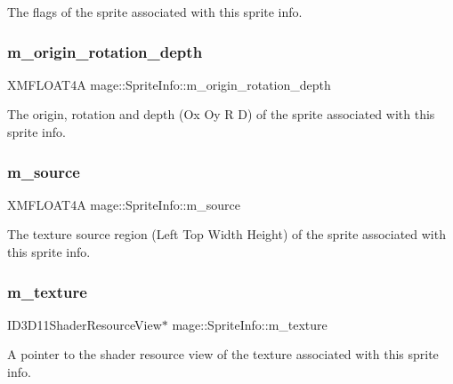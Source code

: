 The flags of the sprite associated with this sprite info. \hypertarget{structmage_1_1_sprite_info_ae8026876747e7b5924d6940551895ccd}{}\label{structmage_1_1_sprite_info_ae8026876747e7b5924d6940551895ccd} 
\subsubsection{\texorpdfstring{m\+\_\+origin\+\_\+rotation\+\_\+depth}{m\_origin\_rotation\_depth}}
{\footnotesize\ttfamily X\+M\+F\+L\+O\+A\+T4A mage\+::\+Sprite\+Info\+::m\+\_\+origin\+\_\+rotation\+\_\+depth}

The origin, rotation and depth (Ox Oy R D) of the sprite associated with this sprite info. \hypertarget{structmage_1_1_sprite_info_a15e373b0b7edf90e512a4a0f665c810f}{}\label{structmage_1_1_sprite_info_a15e373b0b7edf90e512a4a0f665c810f} 
\subsubsection{\texorpdfstring{m\+\_\+source}{m\_source}}
{\footnotesize\ttfamily X\+M\+F\+L\+O\+A\+T4A mage\+::\+Sprite\+Info\+::m\+\_\+source}

The texture source region (Left Top Width Height) of the sprite associated with this sprite info. \hypertarget{structmage_1_1_sprite_info_aea9963f991406a050bc5759fb05cfd5e}{}\label{structmage_1_1_sprite_info_aea9963f991406a050bc5759fb05cfd5e} 
\subsubsection{\texorpdfstring{m\+\_\+texture}{m\_texture}}
{\footnotesize\ttfamily I\+D3\+D11\+Shader\+Resource\+View$\ast$ mage\+::\+Sprite\+Info\+::m\+\_\+texture}

A pointer to the shader resource view of the texture associated with this sprite info. \hypertarget{structmage_1_1_sprite_info_a737c785bc6e9391f159ac4a5656316f7}{}\label{structmage_1_1_sprite_info_a737c785bc6e9391f159ac4a5656316f7} 
